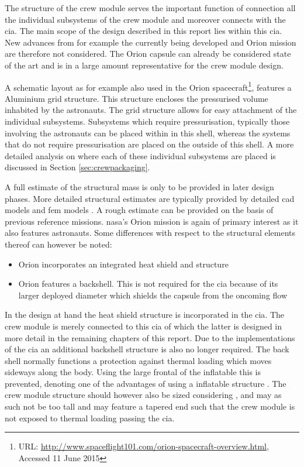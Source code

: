 The structure of the crew module serves the important function of connection all the individual subsystems of the crew module and moreover connects with the \gls{cia}. The main scope of the design described in this report lies within this \gls{cia}. New advances from for example the currently being developed and Orion mission are therefore not considered. The Orion capsule can already be considered state of the art and is in a large amount representative for the crew module design.

A schematic layout as for example also used in the Orion spacecraft\footnote{URL: \url{http://www.spaceflight101.com/orion-spacecraft-overview.html}, Accessed 11 June 2015 }, features a Aluminium grid structure. This structure encloses the pressurised volume inhabited by the astronauts. The grid structure allows for easy attachment of the individual subsystems. Subsystems which require pressurisation, typically those involving the astronauts can be placed within in this shell, whereas the systems that do not require pressurisation are placed on the outside of this shell. A more detailed analysis on where each of these individual subsystems are placed is discussed in Section \ref{sec:crewpackaging}.


A full estimate of the structural mass is only to be provided in later design phases. More detailed structural estimates are typically provided by detailed \gls{cad} models and \gls{fem} models \cite{Wertz2011}. A rough estimate can be provided on the basis of previous reference missions. \gls{nasa}'s Orion mission is again of primary interest as it also features astronauts. Some differences with respect to the structural elements thereof can however be noted:

\begin{itemize}
\item Orion incorporates an integrated heat shield and structure
\item Orion features a backshell. This is not required for the \gls{cia} because of its larger deployed diameter which shields the capsule from the oncoming flow
\end{itemize}

In the design at hand the heat shield structure is incorporated in the \gls{cia}. The crew module is merely connected to this \gls{cia} of which the latter is designed in more detail in the remaining chapters of this report. Due to the implementations of the \gls{cia} an additional backshell structure is also no longer required. The back shell normally functions a protection against thermal loading which moves sideways along the body. Using the large frontal of the inflatable this is prevented, denoting one of the advantages of using a inflatable structure \cite{Hughes2005}. The crew module structure should however also be sized considering , and may as such not be too tall and may feature a tapered end such that the crew module is not exposed to thermal loading passing the \gls{cia}.


